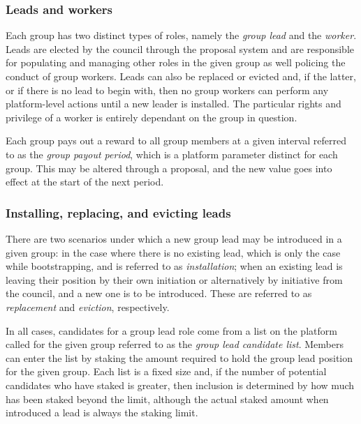 \documentclass{article}
\begin{document}
\subsubsection{Leads and workers}

Each group has two distinct types of roles, namely the \textit{group lead} and the \textit{worker}. Leads are elected by the council through the proposal system and are responsible for populating and managing other roles in the given group as well policing the conduct of group workers. Leads can also be replaced or evicted and, if the latter, or if there is no lead to begin with, then no group workers can perform any platform-level actions until a new leader is installed. The particular rights and privilege of a worker is entirely dependant on the group in question.

Each group pays out a reward to all group members at a given interval referred to as the \textit{group payout period}, which is a platform parameter distinct for each group. This may be altered through a proposal, and the new value goes into effect at the start of the next period.

\subsubsection{Installing, replacing, and evicting leads}

There are two scenarios under which a new group lead may be introduced in a given group: in the case where there is no existing lead, which is only the case while bootstrapping, and is referred to as \textit{installation}; when an existing lead is leaving their position by their own initiation or alternatively by initiative from the council, and a new one is to be introduced. These are referred to as \textit{replacement} and \textit{eviction}, respectively.

In all cases, candidates for a group lead role come from a list on the platform called for the given group referred to as the \textit{group lead candidate list}. Members can enter the list by staking the amount required to hold the group lead position for the given group. Each list is a fixed size and, if the number of potential candidates who have staked is greater, then inclusion is determined by how much has been staked beyond the limit, although the actual staked amount when introduced a lead is always the staking limit.

\end{document}
